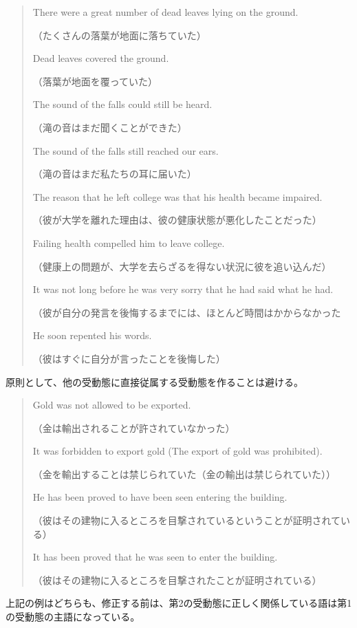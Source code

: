 \begin{quote}
    There were a great number of dead leaves lying on the ground.
    
    （たくさんの落葉が地面に落ちていた）
    
    Dead leaves covered the ground.
    
    （落葉が地面を覆っていた）
    
    The sound of the falls could still be heard.
    
    （滝の音はまだ聞くことができた）

    The sound of the falls still reached our ears.
    
    （滝の音はまだ私たちの耳に届いた）
    
    The reason that he left college was that his health became
impaired.

（彼が大学を離れた理由は、彼の健康状態が悪化したことだった）

Failing health compelled him to leave college.

（健康上の問題が、大学を去らざるを得ない状況に彼を追い込んだ）

It was not long before he was very sorry that he had said what he
had.

（彼が自分の発言を後悔するまでには、ほとんど時間はかからなかった

He soon repented his words.

（彼はすぐに自分が言ったことを後悔した）
\end{quote}
原則として、他の受動態に直接従属する受動態を作ることは避ける。
\begin{quote}
    Gold was not allowed to be exported.
    
    （金は輸出されることが許されていなかった）
    
    It was forbidden to export gold (The export of gold was
prohibited).

（金を輸出することは禁じられていた（金の輸出は禁じられていた））

He has been proved to have been seen entering the building.

（彼はその建物に入るところを目撃されているということが証明されている）

It has been proved that he was seen to enter the building.

（彼はその建物に入るところを目撃されたことが証明されている）
\end{quote}
上記の例はどちらも、修正する前は、第2の受動態に正しく関係している語は第1の受動態の主語になっている。
\par
